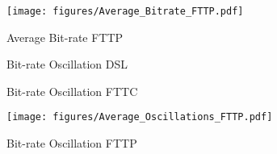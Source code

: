 \documentclass[10pt,sigconf]{acmart}
\begin{document}
\begin{figure}
    \centering
    \texttt{[image: figures/Average\_Bitrate\_FTTP.pdf]}
    \caption{Average Bit-rate FTTP}
    \label{fig:avg-bitrate-FTTP}
\end{figure}

\begin{figure}
    \centering
    \caption{ Bit-rate Oscillation DSL}
    \label{fig:avg-oscillation-DSL}
\end{figure}

\begin{figure}
    \centering
    \caption{ Bit-rate Oscillation FTTC}
    \label{fig:avg-oscillation-FTTC}
\end{figure}

\begin{figure}
    \centering
    \texttt{[image: figures/Average\_Oscillations\_FTTP.pdf]}
    \caption{ Bit-rate Oscillation FTTP}
    \label{fig:avg-oscillation-FTTP}
\end{figure}



\end{document}
